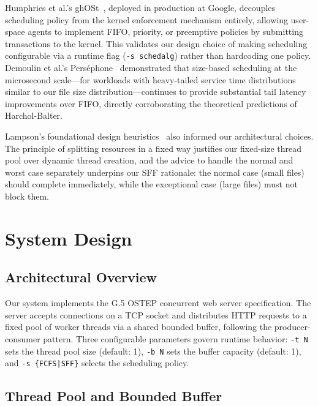 \documentclass[conference]{IEEEtran}
\begin{document}
Humphries et al.'s ghOSt~\cite{ghost2021}, deployed in production at Google,
decouples scheduling policy from the kernel enforcement mechanism entirely,
allowing user-space agents to implement FIFO, priority, or preemptive policies
by submitting transactions to the kernel. This validates our design choice of
making scheduling configurable via a runtime flag (\texttt{-s schedalg})
rather than hardcoding one policy. Demoulin et al.'s
Perséphone~\cite{persephone2021} demonstrated that size-based scheduling at
the microsecond scale---for workloads with heavy-tailed service time
distributions similar to our file size distribution---continues to provide
substantial tail latency improvements over FIFO, directly corroborating the
theoretical predictions of Harchol-Balter.

Lampson's foundational design heuristics~\cite{lampson1983} also informed our
architectural choices. The principle of splitting resources in a fixed way
justifies our fixed-size thread pool over dynamic thread creation, and the
advice to handle the normal and worst case separately underpins our SFF
rationale: the normal case (small files) should complete immediately, while
the exceptional case (large files) must not block them.

\section{System Design}
\label{sec:design}

\subsection{Architectural Overview}

Our system implements the G.5 OSTEP concurrent web server specification. The
server accepts connections on a TCP socket and distributes HTTP requests to a
fixed pool of worker threads via a shared bounded buffer, following the
producer-consumer pattern. Three configurable parameters govern runtime
behavior: \texttt{-t~N} sets the thread pool size (default: 1), \texttt{-b~N}
sets the buffer capacity (default: 1), and \texttt{-s~\{FCFS|SFF\}} selects
the scheduling policy.

\subsection{Thread Pool and Bounded Buffer}
\end{document}
